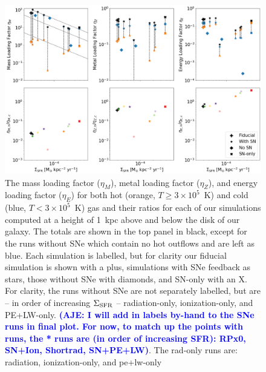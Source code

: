 \documentclass[twocolumn]{aastex62}
\newcommand{\aje}[1]{\textcolor{blue}{\textbf{(AJE: #1)}}}
\begin{document}

\begin{figure}
  \centering
  \includegraphics[width=0.95\linewidth]{figures/phys_comparison_mass_metal_hot_cold_SFR}
  \caption{The mass loading factor ($\eta_M$), metal loading factor ($\eta_Z$), and energy loading factor ($\eta_E$) for both hot (orange, $T \geq 3 \times 10^5$~K) and cold (blue, $T < 3 \times 10^5$~K) gas and their ratios for each of our simulations computed at a height of 1~kpc above and below the disk of our galaxy. The totals are shown in the top panel in black, except for the runs without SNe which contain no hot outflows and are left as blue. Each simulation is labelled, but for clarity our fiducial simulation is shown with a plus, simulations with SNe feedback as stars, those without SNe with diamonds, and SN-only with an X. For clarity, the runs without SNe are not separately labelled, but are -- in order of increasing $\Sigma_{\rm SFR}$ -- radiation-only, ionization-only, and PE+LW-only. \aje{I will add in labels by-hand to the SNe runs in final plot. For now, to match up the points with runs, the * runs are (in order of increasing SFR): RPx0, SN+Ion, Shortrad, SN+PE+LW}. The rad-only runs are: radiation, ionization-only, and pe+lw-only}
  \label{fig:loading_factors}
\end{figure}
\end{document}
